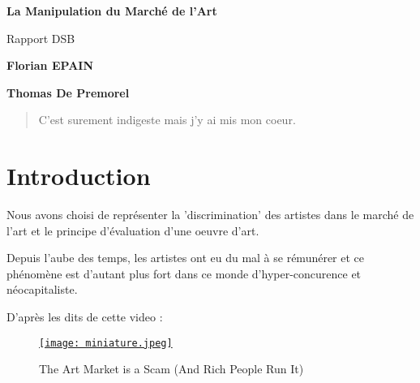 \documentclass{article}
\begin{document}
\begin{titlepage}
   \begin{center}
       \vspace*{1cm}
       \Huge
       \textbf{La Manipulation du Marché de l'Art}

       \vspace{0.5cm}
       \LARGE
        Rapport DSB
        
            
       \vspace{1.5cm}

       \textbf{Florian EPAIN}
       
       
       \textbf{Thomas De Premorel}
       
       
       \vspace{0.5cm}

   \end{center}
   
   \vspace{13cm}
    \begin{abstract}
        C'est surement indigeste mais j'y ai mis mon coeur.
    \end{abstract}
\end{titlepage}



\tableofcontents
\clearpage


\section{Introduction}

Nous avons choisi de représenter la 'discrimination' des artistes dans le marché de l'art et le principe d'évaluation d'une oeuvre d'art.

Depuis l'aube des temps, les artistes ont eu du mal à se rémunérer et ce phénomène est d'autant plus fort dans ce monde d'hyper-concurence et néocapitaliste.

D'après les dits de cette video : 
\begin{figure}[htp]
    \centering
    \href{https://www.youtube.com/watch?v=ZZ3F3zWiEmc}
    {\texttt{[image: miniature.jpeg]}}
    \caption{\label{fig:miniature}The Art Market is a Scam (And Rich People Run It)}
\end{figure}
\end{document}
